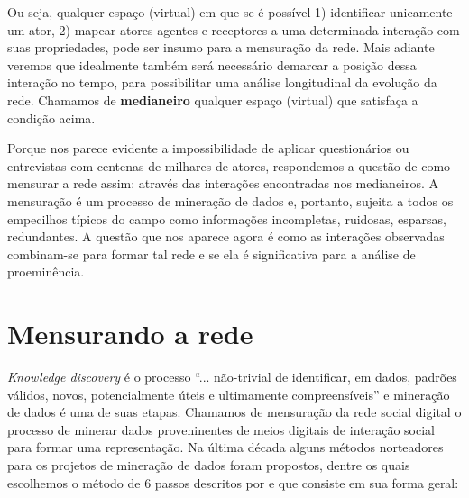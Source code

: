 Ou seja, qualquer espaço (virtual) em que se é possível 1) identificar
unicamente um ator, 2) mapear atores agentes e receptores a uma determinada
interação com suas propriedades, pode ser insumo para a mensuração da rede. Mais
adiante veremos que idealmente também será necessário demarcar a posição dessa
interação no tempo, para possibilitar uma análise longitudinal da evolução da
rede. Chamamos de \textbf{medianeiro} qualquer espaço (virtual) que satisfaça a
condição acima.

Porque nos parece evidente a impossibilidade de aplicar questionários ou
entrevistas com centenas de milhares de atores, respondemos a questão de como
mensurar a rede assim: através das interações encontradas nos medianeiros. A
mensuração é um processo de mineração de dados e, portanto, sujeita a todos os
empecilhos típicos do campo como informações incompletas, ruidosas, esparsas,
redundantes. A questão que nos aparece agora é como as interações observadas
combinam-se para formar tal rede e se ela é significativa para a análise de
proeminência.

\section{Mensurando a rede}
\label{sec:kddm}

\emph{Knowledge discovery} é o processo ``... não-trivial de identificar,
em dados, padrões válidos, novos, potencialmente úteis e ultimamente
compreensíveis'' \citep{Fayyad1996} e mineração de dados é uma de suas etapas.
Chamamos de mensuração da rede social digital o processo de minerar dados
proveninentes de meios digitais de interação social para formar uma
representação. Na última década alguns métodos norteadores para os projetos de
mineração de dados foram propostos, dentre os quais escolhemos o método de 6
passos descritos por \cite{Cios2005} e que consiste em sua forma geral:

